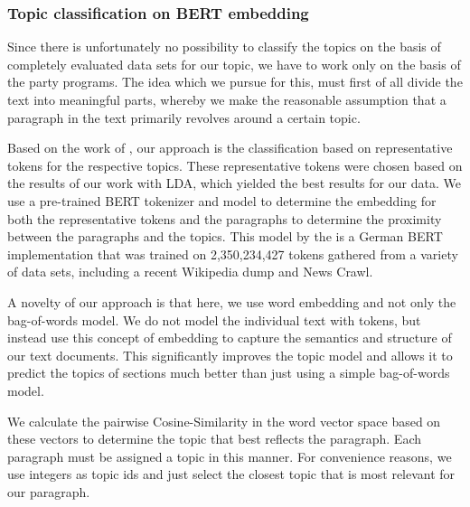 \subsubsection{Topic classification on BERT embedding}
Since there is unfortunately no possibility to classify the topics on the basis of completely evaluated data sets for our topic, we have to work only on the basis of the party programs. The idea which we pursue for this, must first of all divide the text into meaningful parts, whereby we make the reasonable assumption that a paragraph in the text primarily revolves around a certain topic.

Based on the work of \citet{Meng2020}, our approach is the classification based on representative tokens for the respective topics. These representative tokens were chosen based on the results of our work with LDA, which yielded the best results for our data. 
We use a pre-trained BERT tokenizer and model to determine the embedding for both the representative tokens and the paragraphs to determine the proximity between the paragraphs and the topics. This model by the \citet{bert-base-german-cased}  is a German BERT implementation that was trained on 2,350,234,427 tokens gathered from a variety of data sets, including a recent Wikipedia dump and News Crawl.

A novelty of our approach is that here, we use word embedding and not only the bag-of-words model. We do not model the individual text with tokens, but instead use this concept of embedding to capture the semantics and structure of our text documents. This significantly improves the topic model and allows it to predict the topics of sections much better than just using a simple bag-of-words model.

We calculate the pairwise Cosine-Similarity in the word vector space based on these vectors to determine the topic that best reflects the paragraph. Each paragraph must be assigned a topic in this manner. For convenience reasons, we use integers as topic ids and just select the closest topic that is most relevant for our paragraph.

